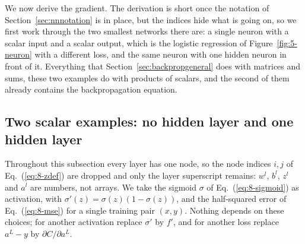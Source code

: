 We now derive the gradient.  The derivation is short once the notation of
Section~\ref{sec:nnnotation} is in place, but the indices hide what is going
on, so we first work through the two smallest networks there are: a single
neuron with a scalar input and a scalar output, which is the logistic
regression of Figure~\ref{fig:5-neuron} with a different loss, and the same
neuron with one hidden neuron in front of it.  Everything that
Section~\ref{sec:backpropgeneral} does with matrices and sums, these two
examples do with products of scalars, and the second of them already contains
the backpropagation equation.

\subsection{Two scalar examples: no hidden layer and one hidden layer}
\label{sec:backpropscalar}

Throughout this subsection every layer has one node, so the node indices $i,j$
of Eq.~(\ref{eq:8-zdef}) are dropped and only the layer superscript remains:
$w^{l}$, $b^{l}$, $z^{l}$ and $a^{l}$ are numbers, not arrays.  We take the
sigmoid $\sigma$ of Eq.~(\ref{eq:8-sigmoid}) as activation, with
$\sigma'(z)=\sigma(z)(1-\sigma(z))$, and the half-squared error of
Eq.~(\ref{eq:8-mse}) for a single training pair $(x,y)$.  Nothing depends on
these choices; for another activation replace $\sigma'$ by $f'$, and for
another loss replace $a^{L}-y$ by $\partial C/\partial a^{L}$.

